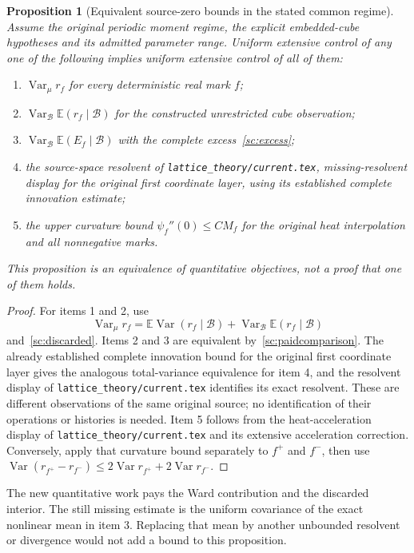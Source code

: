\documentclass[11pt]{article}
\newtheorem{proposition}[theorem]{Proposition}
\theoremstyle{definition}\newtheorem{definition}[theorem]{Definition}
\theoremstyle{remark}\newtheorem{remark}[theorem]{Remark}
\newcommand{\E}{\mathbb E}\newcommand{\Var}{\operatorname{Var}}
\begin{document}
\begin{proposition}[Equivalent source-zero bounds in the stated common regime]
\label{sc:equivalence}
Assume the original periodic moment regime, the explicit embedded-cube hypotheses and its admitted parameter range. Uniform extensive control of any one of the following implies uniform extensive control of all of them:
\begin{enumerate}
 \item \(\Var_\mu r_f\) for every deterministic real mark \(f\);
 \item \(\Var_{\mathcal B}\E(r_f\mid\mathcal B)\) for the constructed unrestricted cube observation;
 \item \(\Var_{\mathcal B}\E(E_f\mid\mathcal B)\) with the complete excess~\eqref{sc:excess};
 \item the source-space resolvent of \texttt{lattice\_theory/current.tex}, missing-resolvent display for the original first coordinate layer, using its established complete innovation estimate;
 \item the upper curvature bound \(\psi_f''(0)\le CM_f\) for the original heat interpolation and all nonnegative marks.
\end{enumerate}
This proposition is an equivalence of quantitative objectives, not a proof that one of them holds.
\end{proposition}

\begin{proof}
For items 1 and 2, use
\[
 \Var_\mu r_f=\E\Var(r_f\mid\mathcal B)
                       +\Var_{\mathcal B}\E(r_f\mid\mathcal B)
\]
and~\eqref{sc:discarded}. Items 2 and 3 are equivalent by~\eqref{sc:paidcomparison}. The already established complete innovation bound for the original first coordinate layer gives the analogous total-variance equivalence for item 4, and the resolvent display of \texttt{lattice\_theory/current.tex} identifies its exact resolvent. These are different observations of the same original source; no identification of their operations or histories is needed. Item 5 follows from the heat-acceleration display of \texttt{lattice\_theory/current.tex} and its extensive acceleration correction. Conversely, apply that curvature bound separately to \(f^+\) and \(f^-\), then use
\(\Var(r_{f^+}-r_{f^-})\le2\Var r_{f^+}+2\Var r_{f^-}\).
\end{proof}

The new quantitative work pays the Ward contribution and the discarded interior. The still missing estimate is the uniform covariance of the exact nonlinear mean in item 3. Replacing that mean by another unbounded resolvent or divergence would not add a bound to this proposition.
\end{document}
